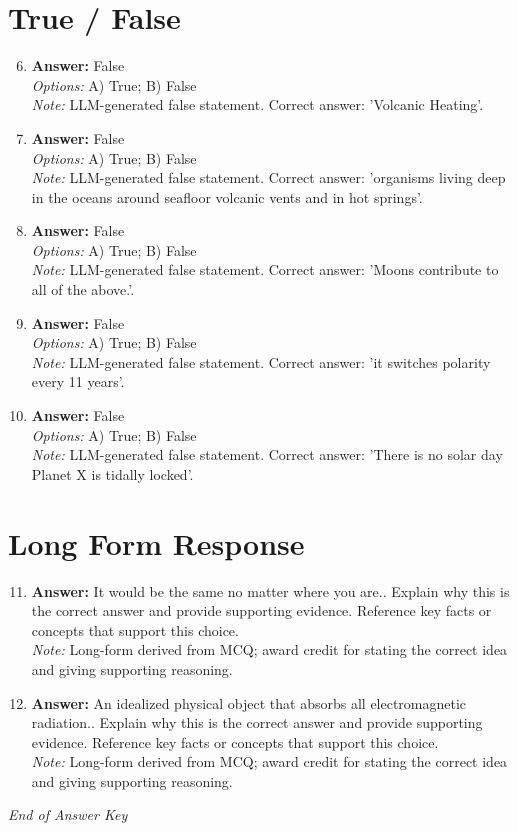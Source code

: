 \documentclass[12pt]{article}
\begin{document}
\section*{True / False}
\begin{enumerate}[label=\arabic*.]
\setcounter{enumi}{5}
\item \textbf{Answer:} False
\\ \textit{Options:} A) True; B) False
\\ \textit{Note:} LLM-generated false statement. Correct answer: 'Volcanic Heating'.
\item \textbf{Answer:} False
\\ \textit{Options:} A) True; B) False
\\ \textit{Note:} LLM-generated false statement. Correct answer: 'organisms living deep in the oceans around seafloor volcanic vents and in hot springs'.
\item \textbf{Answer:} False
\\ \textit{Options:} A) True; B) False
\\ \textit{Note:} LLM-generated false statement. Correct answer: 'Moons contribute to all of the above.'.
\item \textbf{Answer:} False
\\ \textit{Options:} A) True; B) False
\\ \textit{Note:} LLM-generated false statement. Correct answer: 'it switches polarity every 11 years'.
\item \textbf{Answer:} False
\\ \textit{Options:} A) True; B) False
\\ \textit{Note:} LLM-generated false statement. Correct answer: 'There is no solar day Planet X is tidally locked'.
\end{enumerate}

\section*{Long Form Response}
\begin{enumerate}[label=\arabic*.]
\setcounter{enumi}{10}
\item \textbf{Answer:} It would be the same no matter where you are.. Explain why this is the correct answer and provide supporting evidence. Reference key facts or concepts that support this choice.
\\ \textit{Note:} Long-form derived from MCQ; award credit for stating the correct idea and giving supporting reasoning.
\item \textbf{Answer:} An idealized physical object that absorbs all electromagnetic radiation.. Explain why this is the correct answer and provide supporting evidence. Reference key facts or concepts that support this choice.
\\ \textit{Note:} Long-form derived from MCQ; award credit for stating the correct idea and giving supporting reasoning.
\end{enumerate}

\vfill
\noindent\textit{End of Answer Key}
\end{document}
